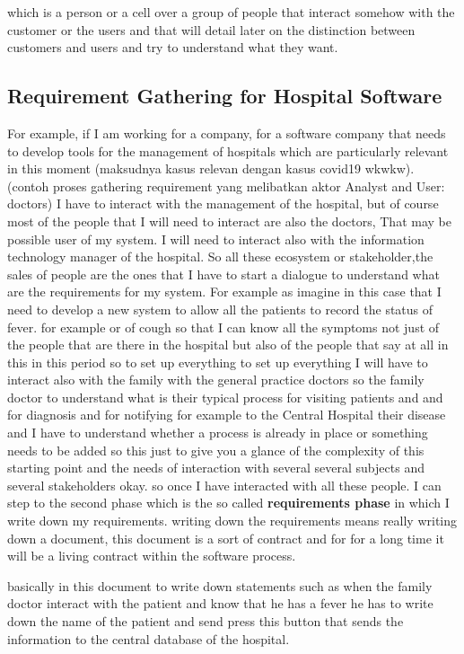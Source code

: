 \documentclass[conference, compsoc, twoside]{IEEEtran}
\begin{document}
which is a person or a cell over a group of people that interact somehow 
with the customer or the users and that will detail later on the distinction between customers and users and try to understand what they want. 
\subsection{Requirement Gathering for Hospital Software}
For example, if I am working for a company, for a software company that needs to develop tools for the management of hospitals which are particularly relevant in this moment (maksudnya kasus relevan dengan kasus covid19 wkwkw).
(contoh proses gathering requirement yang melibatkan aktor Analyst and User: doctors)
I have to interact with the management of the hospital, but of course most of the people that I will need to interact are also the doctors,
That may be possible user of my system. 
I will need to interact also with the information technology manager of the hospital.
So all these ecosystem or stakeholder,the sales of people are the ones that I have to start a dialogue to understand what are the requirements for my system.
For example as imagine in this case that I need to develop a new system to allow all the patients to record the status of fever. 
for example or of cough so that I can know all the symptoms not just of the people that are there in the hospital but also of the people that say at all in this in this period so to set up everything to set up everything I will have to interact also with the family with the general practice doctors so the family doctor to understand what is their typical process for visiting patients and and for diagnosis and for notifying 
for example to the Central Hospital their disease and I have to understand whether a process is already in place or something needs to be added so this just to give you a glance of the complexity of this starting point and the needs of interaction with several several subjects and several stakeholders okay.
so once I have interacted with all these people. 
I can step to the second phase which is the so called \textbf{requirements phase} in which I write down my requirements.
writing down the requirements means really writing down a document, this document is a sort of contract and for for a long time it will be a living contract within the software process. 

basically in this document to write down statements such as when the family doctor interact with the patient and know that he has a fever he has to write down the name of the patient and send press this button that sends the information to the central database of the hospital.
\end{document}
